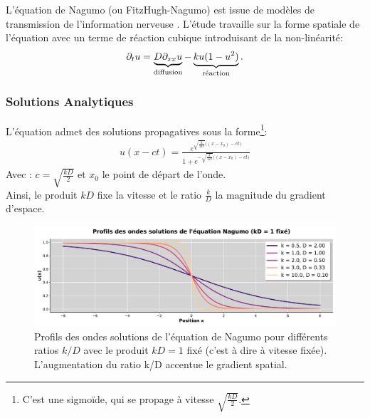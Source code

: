 \label{par:analyser_operateurs_nagumo}
L'équation de Nagumo (ou FitzHugh-Nagumo) est issue de modèles de transmission de l'information nerveuse \cite{FITZHUGH1961445}.
L'étude travaille sur la forme spatiale de l'équation \cite{keener1998mathematical} avec un terme de réaction cubique introduisant de la non-linéarité:
\begin{align}
    \partial_t u = \underbrace{D \partial_{xx} u}_{\text{diffusion}}
            - \underbrace{ku(1-u^2)}_{\text{réaction}}.
\end{align}
\subsubsection{Solutions Analytiques}
L'équation admet des solutions propagatives sous la forme\footnote{C'est une sigmoïde, qui se propage à vitesse $\sqrt{\frac{kD}{2}}$.}:%
\begin{align}
    \label{eq:sol_nagumo}
    u(x-ct) = \frac{e^{
        \sqrt{\frac{k}{2D}} \bigl((x-x_0) - ct \bigr)}
    }
    {1 + e^{
        -\sqrt{\frac{k}{2D}} \bigl((x-x_0) - ct \bigr)}
    }
\end{align}
Avec : $c = \sqrt{\frac{kD}{2}}$ et $x_0$ le point de départ de l'onde.\\
Ainsi, le produit $kD$ fixe la vitesse et le ratio $\frac{k}{D}$ la magnitude du gradient d'espace.

\begin{figure}[htbp]
    \centering
    \includegraphics[width=\textwidth]{media/4_travail/2_nagumo/profils_nagumo.pdf}
    \caption{Profils des ondes solutions de l'équation de Nagumo pour différents ratios $k/D$ avec le produit $kD = 1$ fixé (c'est à dire à vitesse fixée). L'augmentation du ratio k/D accentue le gradient spatial.}
    \label{fig:profils_nagumo}
\end{figure}

